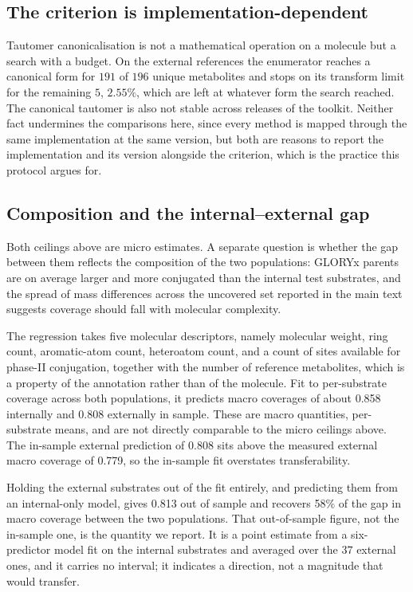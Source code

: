 \subsection{The criterion is implementation-dependent}

Tautomer canonicalisation is not a mathematical operation on a molecule but a search with a
budget. On the external references the enumerator reaches a canonical form for $191$ of $196$ unique
metabolites and stops on its transform limit for the remaining $5$, $2.55\%$, which are left at
whatever form the search reached. The canonical tautomer is also not stable across releases of
the toolkit. Neither fact undermines the comparisons here, since every method is mapped through the
same implementation at the same version, but both are reasons to report the implementation and its
version alongside the criterion, which is the practice this protocol argues for.

\subsection{Composition and the internal--external gap}

Both ceilings above are micro estimates. A separate question is whether the gap between them
reflects the composition of the two populations: GLORYx parents are on average larger and more
conjugated than the internal test substrates, and the spread of mass differences across the
uncovered set reported in the main text suggests coverage should fall with molecular complexity.

The regression takes five molecular descriptors, namely molecular weight, ring count,
aromatic-atom count, heteroatom count, and a count of sites available for phase-II conjugation,
together with the number of reference metabolites, which is a property of the annotation rather
than of the molecule. Fit to per-substrate coverage across both populations, it predicts macro
coverages of about 0.858 internally and 0.808 externally in sample. These are macro quantities,
per-substrate means, and are not directly comparable to the micro ceilings above. The in-sample
external prediction of 0.808 sits above the measured external macro coverage of 0.779, so the
in-sample fit overstates transferability.

Holding the external substrates out of the fit entirely, and predicting them from an
internal-only model, gives 0.813 out of sample and recovers 58\% of the gap in macro
coverage between the two populations. That out-of-sample figure, not the in-sample one, is the
quantity we report. It is a point estimate from a six-predictor model fit on the internal substrates
and averaged over the $37$ external ones, and it carries no interval; it indicates a direction, not
a magnitude that would transfer.

